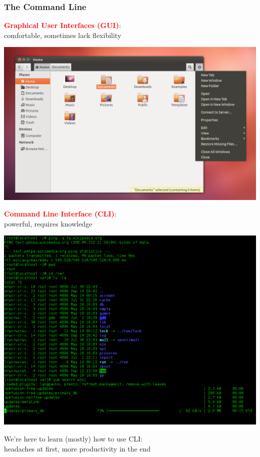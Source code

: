 \documentclass[unknownkeysallowed, 10pt, a4 paper, handout]{beamer}
\newcommand{\focus}[1]{\textbf{\textcolor{red}{#1}}}
\newcommand{\sidebyside}[5]{
  \begin{minipage}{#1\textwidth}
    #2
  \end{minipage} #3 \begin{minipage}{#4\textwidth}
    #5
  \end{minipage}
}
\begin{document}
\begin{frame}[c]
  \begin{center}
    \frametitle{The Command Line}

    \sidebyside{0.54}{
      \focus{Graphical User Interfaces (GUI)}:\\
      comfortable, sometimes lack flexibility
    }{\hfill}{0.41}{
      \includegraphics[width=\textwidth]{pics/gui.png}
    }

    \sidebyside{0.54}{
      \focus{Command Line Interface (CLI)}:\\
      powerful, requires knowledge
    }{\hfill}{0.41}{
      \includegraphics[width=\textwidth]{pics/cli.png}
    }

    \vspace{-2mm}

    We're here to learn (mostly) how to use CLI:\\
    headaches at first, more productivity in the end

  \end{center}
\end{frame}
\end{document}
